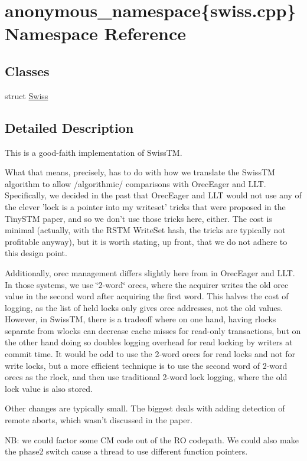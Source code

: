 \hypertarget{namespaceanonymous__namespace_02swiss_8cpp_03}{\section{anonymous\-\_\-namespace\{swiss.\-cpp\} Namespace Reference}
\label{namespaceanonymous__namespace_02swiss_8cpp_03}
}
\subsection*{Classes}
\begin{DoxyCompactItemize}
\item 
struct \hyperlink{structanonymous__namespace_02swiss_8cpp_03_1_1Swiss}{Swiss}
\end{DoxyCompactItemize}


\subsection{Detailed Description}
This is a good-\/faith implementation of Swiss\-T\-M.

What that means, precisely, has to do with how we translate the Swiss\-T\-M algorithm to allow /algorithmic/ comparisons with Orec\-Eager and L\-L\-T. Specifically, we decided in the past that Orec\-Eager and L\-L\-T would not use any of the clever 'lock is a pointer into my writeset' tricks that were proposed in the Tiny\-S\-T\-M paper, and so we don't use those tricks here, either. The cost is minimal (actually, with the R\-S\-T\-M Write\-Set hash, the tricks are typically not profitable anyway), but it is worth stating, up front, that we do not adhere to this design point.

Additionally, orec management differs slightly here from in Orec\-Eager and L\-L\-T. In those systems, we use \char`\"{}2-\/word\char`\"{} orecs, where the acquirer writes the old orec value in the second word after acquiring the first word. This halves the cost of logging, as the list of held locks only gives orec addresses, not the old values. However, in Swiss\-T\-M, there is a tradeoff where on one hand, having rlocks separate from wlocks can decrease cache misses for read-\/only transactions, but on the other hand doing so doubles logging overhead for read locking by writers at commit time. It would be odd to use the 2-\/word orecs for read locks and not for write locks, but a more efficient technique is to use the second word of 2-\/word orecs as the rlock, and then use traditional 2-\/word lock logging, where the old lock value is also stored.

Other changes are typically small. The biggest deals with adding detection of remote aborts, which wasn't discussed in the paper.

N\-B\-: we could factor some C\-M code out of the R\-O codepath. We could also make the phase2 switch cause a thread to use different function pointers. 